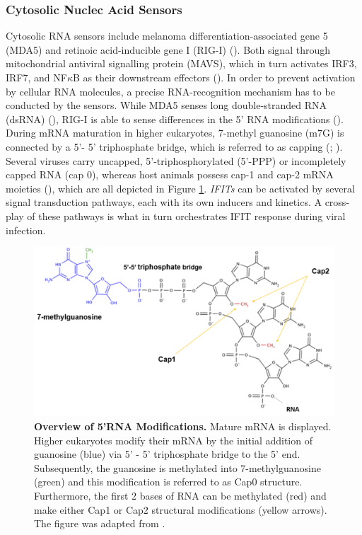 \subsubsection{Cytosolic Nuclec Acid Sensors} \label{Cytosolic Nuclec Acid Sensors}
Cytosolic RNA sensors include melanoma differentiation-associated gene 5 (MDA5) and retinoic acid-inducible gene I (RIG-I) (\cite{Vladimer2014IFITs:Proteins}). Both signal through mitochondrial antiviral signalling protein (MAVS), which in turn activates IRF3, IRF7, and NF\(\kappa\)B as their downstream effectors (\cite{Ashley2019Interferon-IndependentCytomegalovirus}). In order to prevent activation by cellular RNA molecules, a precise RNA-recognition mechanism has to be conducted by the sensors. While MDA5 senses long double-stranded RNA (dsRNA) (\cite{Brisse2019ComparativeMDA5}), RIG-I is able to sense differences in the 5' RNA modifications (\cite{Schlee2016DiscriminatingSensing}). During mRNA maturation in higher eukaryotes, 7-methyl guanosine (m7G) is connected by a 5'- 5' triphosphate bridge, which is referred to as capping (\cite{Devarkar2016StructuralRIG-I}; \cite{Ramanathan2016MRNAApplications}). Several viruses carry uncapped, 5'-triphosphorylated (5'-PPP) or incompletely capped RNA (cap 0), whereas host animals possess cap-1 and cap-2 mRNA moieties (\cite{Choi2018ACaps}), which are all depicted in Figure \ref{fig:Overview of 5'RNA Modifications.}. \textit{IFITs} can be activated by several signal transduction pathways, each with its own inducers and kinetics. A cross-play of these pathways is what in turn orchestrates IFIT response during viral infection.

\begin{figure}
    \centering
    \includegraphics[width=0.75\linewidth]{04. Introduction//Figs/02. 5-RNA Modifications.png}
    \caption[Overview of 5'RNA Modifications.]{\textbf{Overview of 5'RNA Modifications.} Mature mRNA is displayed. Higher eukaryotes modify their mRNA by the initial addition of guanosine (blue) via 5' - 5' triphosphate bridge to the 5' end. Subsequently, the guanosine is methylated into 7-methylguanosine (green) and this modification is referred to as Cap0 structure. Furthermore, the first 2 bases of RNA can be methylated (red) and make either Cap1 or Cap2 structural modifications (yellow arrows). The figure was adapted from \cite{Picard-Jean2013RNAGenomes}.}
    \label{fig:Overview of 5'RNA Modifications.}
\end{figure}

